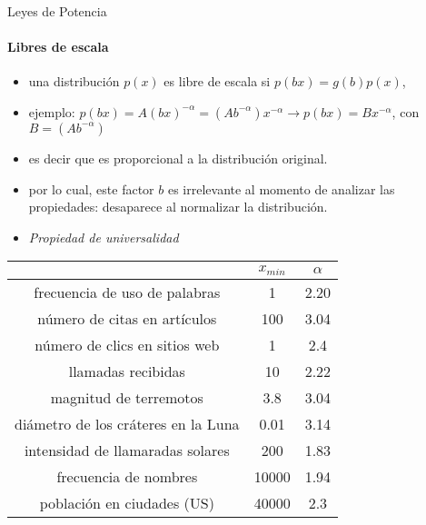 \documentclass[11pt]{beamer}
\begin{document}
\begin{frame}{Leyes de Potencia}
\framesubtitle{Libres de escala}
\begin{itemize}
    \item una distribución $p(x)$ es libre de escala si $p(bx)=g(b)p(x)$,
    \item ejemplo: $p(bx)=A(bx)^{-\alpha}=(Ab^{-\alpha})x^{-\alpha} \longrightarrow p(bx)=Bx^{-\alpha}$, con $B=(Ab^{-\alpha})$
    \item es decir que es proporcional a la distribución original.
    \item por lo cual, este factor $b$ es irrelevante al momento de analizar las propiedades: desaparece al normalizar la distribución.
    \item \textit{Propiedad de universalidad}
\end{itemize}
\begin{table}
\centering
\scriptsize
\begin{tabular}{|c|c|c|}
\hline
	& $x_{min}$ & $\alpha$ \\
	\hline
frecuencia de uso de palabras	& 1 & 2.20 \\
	\hline
número de citas en artículos & 100 & 3.04 \\
	\hline
número de clics en sitios web	& 1  & 2.4 \\
	\hline
llamadas recibidas	& 10 & 2.22 \\
	\hline
magnitud de terremotos	& 3.8 & 3.04 \\
	\hline
diámetro de los cráteres en la Luna	& 0.01 & 3.14 \\
	\hline
intensidad de llamaradas solares & 200 & 1.83 \\
	\hline
frecuencia de nombres & 10000 & 1.94 \\
	\hline
población en ciudades (US)	& 40000 & 2.3 \\
	\hline
\end{tabular}
\end{table}
\end{frame}
\end{document}
